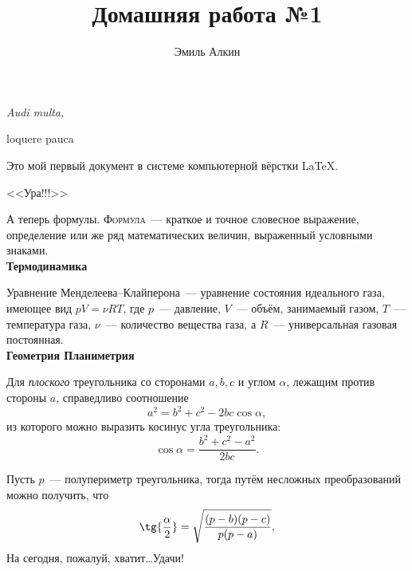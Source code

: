\documentclass[12pt]{article}
\title{Домашняя работа №1}
\author{Эмиль Алкин}
\date{}
\begin{document}
	\maketitle
	{\itshape \hfill Audi multa, \par
	\hfill loquere pauca} \par
	\vspace{20 pt}
	Это мой первый документ в системе компьютерной вёрстки \LaTeX .\\
	\begin{center}
	{\sffamily \LARGE <<Ура!!!>>}
	\end{center}
	
	А теперь формулы. {\scshape Формула}~--- краткое и точное словесное выражение, определение или же ряд математических величин, выраженный условными знаками.\\[15pt]
	\hspace*{28pt} {\bfseries \Large Термодинамика} \par
	Уравнение Менделеева--Клайперона~--- уравнение состояния идеального газа, имеющее вид $pV=\nu RT$, где $p$~--- давление, $V$~--- объём, занимаемый газом, $T$~--- температура газа, $\nu$~--- количество вещества газа, а $R$~--- универсальная газовая постоянная.\\[15pt]
	\hspace*{28pt} {\bfseries \Large Геометрия \hfill Планиметрия}\par
	Для {\itshape плоского} треугольника со сторонами $a, b, c$ и углом $\alpha$, лежащим против стороны $a$, справедливо соотношение 
	$$a^2 = b^2 + c^2 - 2bc\cos{\alpha},$$ 
	из которого можно выразить косинус угла треугольника: 
	$$\cos{\alpha}=\frac{b^2+c^2-a^2}{2bc}.$$
	
	Пусть $p$~--- полупериметр треугольника, тогда путём несложных преобразований можно получить, что 
	$$\tg{\frac{\alpha}{2}}=\sqrt{\frac{(p - b)(p - c)}{p(p - a)}},$$
	\vspace{1cm}
	На сегодня, пожалуй, хватит\dots Удачи!
\end{document}
